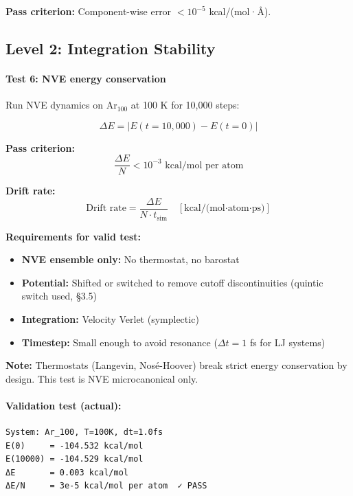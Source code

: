 \documentclass[11pt]{article}
\begin{document}
\textbf{Pass criterion:} Component-wise error $< 10^{-5}$ kcal/(mol·Å).

\subsection{Level 2: Integration Stability}

\paragraph{Test 6: NVE energy conservation}

Run NVE dynamics on Ar$_{100}$ at 100 K for 10,000 steps:

\begin{equation}
\Delta E = |E(t=10{,}000) - E(t=0)|
\end{equation}

\textbf{Pass criterion:}
\begin{equation}
\frac{\Delta E}{N} < 10^{-3} \text{ kcal/mol per atom}
\end{equation}

\textbf{Drift rate:}
\begin{equation}
\text{Drift rate} = \frac{\Delta E}{N \cdot t_{\text{sim}}} \quad [\text{kcal/(mol·atom·ps)}]
\end{equation}

\textbf{Requirements for valid test:}
\begin{itemize}
\item \textbf{NVE ensemble only:} No thermostat, no barostat
\item \textbf{Potential:} Shifted or switched to remove cutoff discontinuities (quintic switch used, §3.5)
\item \textbf{Integration:} Velocity Verlet (symplectic)
\item \textbf{Timestep:} Small enough to avoid resonance ($\Delta t = 1$ fs for LJ systems)
\end{itemize}

\textbf{Note:} Thermostats (Langevin, Nosé-Hoover) break strict energy conservation by design. This test is NVE microcanonical only.

\paragraph{Validation test (actual):}

\begin{verbatim}
System: Ar_100, T=100K, dt=1.0fs
E(0)     = -104.532 kcal/mol
E(10000) = -104.529 kcal/mol
ΔE       = 0.003 kcal/mol
ΔE/N     = 3e-5 kcal/mol per atom  ✓ PASS
\end{verbatim}
\end{document}
